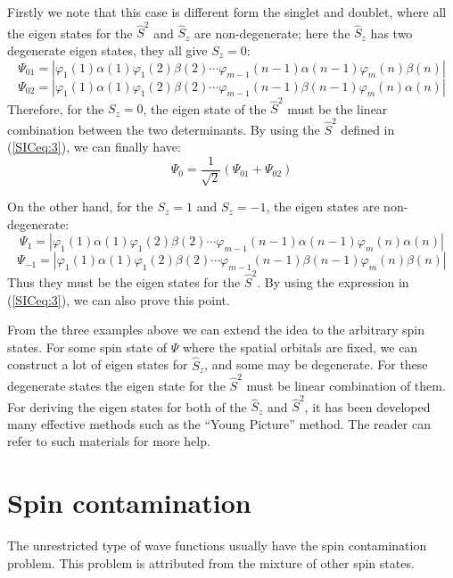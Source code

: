 Firstly we note that this case is different form the singlet and
doublet, where all the eigen states for the $\hat{S}^{2}$ and
$\hat{S}_{z}$ are non-degenerate; here the $\hat{S}_{z}$ has two
degenerate eigen states, they all give $S_{z} = 0$:
\begin{equation}\label{}
\Psi_{01} = |\varphi_{1}(1)\alpha(1)\varphi_{1}(2)\beta(2) \cdots
\varphi_{m-1}(n-1)\alpha(n-1) \varphi_{m}(n)\beta(n)|
\end{equation}
\begin{equation}\label{}
\Psi_{02} = |\varphi_{1}(1)\alpha(1)\varphi_{1}(2)\beta(2) \cdots
\varphi_{m-1}(n-1)\beta(n-1) \varphi_{m}(n)\alpha(n)|
\end{equation}
Therefore, for the $S_{z} = 0$, the eigen state of the $\hat{S}^{2}$
must be the linear combination between the two determinants. By
using the $\hat{S}^{2}$ defined in (\ref{SICeq:3}), we can finally
have:
\begin{equation}\label{}
\Psi_{0} = \frac{1}{\sqrt{2}}(\Psi_{01} + \Psi_{02})
\end{equation}

On the other hand, for the $S_{z} = 1$ and $S_{z} = -1$, the eigen
states are non-degenerate:
\begin{equation}\label{}
\Psi_{1} = |\varphi_{1}(1)\alpha(1)\varphi_{1}(2)\beta(2) \cdots
\varphi_{m-1}(n-1)\alpha(n-1) \varphi_{m}(n)\alpha(n)|
\end{equation}
\begin{equation}\label{}
\Psi_{-1} = |\varphi_{1}(1)\alpha(1)\varphi_{1}(2)\beta(2) \cdots
\varphi_{m-1}(n-1)\beta(n-1) \varphi_{m}(n)\beta(n)|
\end{equation}
Thus they must be the eigen states for the $\hat{S}^{2}$. By using
the expression in (\ref{SICeq:3}), we can also prove this point.

From the three examples above we can extend the idea to the
arbitrary spin states. For some spin state of $\Psi$ where the
spatial orbitals are fixed, we can construct a lot of eigen states
for $\hat{S}_{z}$, and some may be degenerate. For these degenerate
states the eigen state for the $\hat{S}^{2}$ must be linear
combination of them. For deriving the eigen states for both of the
$\hat{S}_{z}$ and $\hat{S}^{2}$, it has been developed many
effective methods such as the ``Young Picture''
method\cite{aoqingTang}. The reader can refer to such materials for
more help.


\section{Spin contamination}
%
%
The unrestricted type of wave functions usually have the spin
contamination problem. This problem is attributed from the mixture
of other spin states.

